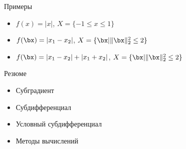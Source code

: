 \documentclass[12pt,russian]{beamer}
\begin{document}
\begin{frame}{Примеры}
\begin{itemize}
\item $f(x) = |x|$, $X = \{-1 \leq x \leq 1 \}$
\item $f(\bx) = |x_1 - x_2|$, $X = \{ \bx | \| \bx \|^2_2 \leq 2 \}$
\item $f(\bx) = |x_1 - x_2| + |x_1 + x_2|$, $X = \{ \bx | \| \bx \|^2_2 \leq 2 \}$
\end{itemize}
\end{frame}

\begin{frame}{Резюме}
\begin{itemize}
\item Субградиент
\item Субдифференциал
\item Условный субдифференциал
\item Методы вычислений
\end{itemize}
\end{frame}
\end{document}
